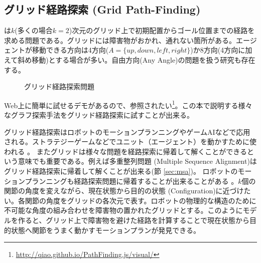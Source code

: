 \subsection{グリッド経路探索 (Grid Path-Finding)}

は$k$(多くの場合$k=2$)次元のグリッド上で初期配置からゴール位置までの経路を求める問題である\cite{yap2002grid}。グリッドには障害物がおかれ、通れない箇所がある。エージェントが移動できる方向は4方向($A= \{up, down, left, right\}$)か8方向(4方向に加えて斜め移動)とする場合が多い。自由方向(Any Angle)の問題を扱う研究も存在する\cite{nash2007theta}。

\begin{figure}
        \centering
        \begin{tikzpicture}[scale=0.5]
          
        \end{tikzpicture}
	\caption{グリッド経路探索問題}
	\label{fig:grid-pathfinding}
\end{figure}


Web上に簡単に試せるデモがあるので、参照されたい\footnote{\url{http://qiao.github.io/PathFinding.js/visual/}}。この本で説明する様々なグラフ探索手法をグリッド経路探索に試すことが出来る。%

グリッド経路探索はロボットのモーションプランニングやゲームAIなどで応用される\cite{algfoor2015comprehensive}。ストラテジーゲームなどでユニット（エージェント）を動かすために使われる \cite{cui2011based,sturtevant2012benchmarks}。%
またグリッドは様々な問題を経路探索に帰着して解くことができるという意味でも重要である。例えば多重整列問題 (Multiple Sequence Alignment)はグリッド経路探索に帰着して解くことが出来る(節 \ref{sec:msa})。
ロボットのモーションプランニングも経路探索問題に帰着することが出来ることがある \cite{barraquand91}。$k$個の関節の角度を変えながら、現在状態から目的の状態 (Configuration)に近づけたい。各関節の角度をグリッドの各次元で表す。ロボットの物理的な構造のために不可能な角度の組み合わせを障害物の置かれたグリッドとする。このようにモデルを作ると、グリッド上で障害物を避けた経路を計算することで現在状態から目的状態へ関節をうまく動かすモーションプランが発見できる。


